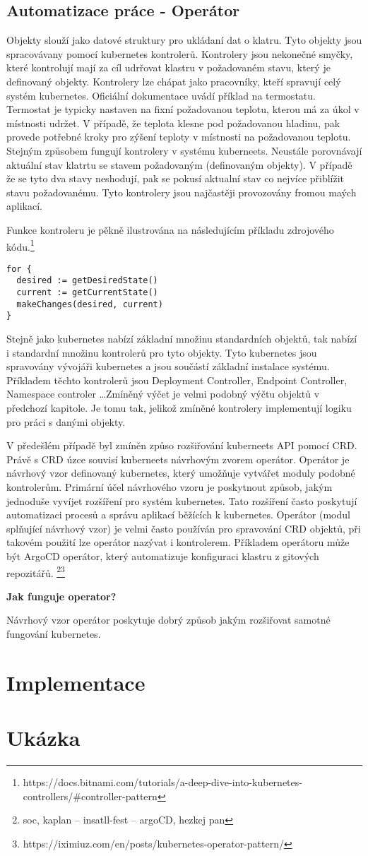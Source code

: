 \subsection{Automatizace práce - Operátor}
Objekty slouží jako datové struktury pro ukládaní dat o klatru. Tyto objekty jsou spracovávany pomocí kubernetes kontrolerů. Kontrolery jsou nekonečné smyčky, které kontrolují mají za cíl udrřovat klastru v požadovaném stavu, který je definovaný objekty. Kontrolery lze chápat jako pracovníky, kteří spravují celý systém kubernetes. Oficiální dokumentace uvádí příklad na termostatu. Termostat je typicky nastaven na fixní požadovanou teplotu, kterou má za úkol v místnosti udržet. V případě, že teplota klesne pod požadovanou hladinu, pak provede potřebné kroky pro zýšení teploty v místnosti na požadovanou teplotu. Stejným způsobem fungují kontrolery v systému kuberneets. Neustále porovnávají aktuální stav klatrtu se stavem požadovaným (definovaným objekty). V případě že se tyto dva stavy neshodují, pak se pokusí aktualní stav co nejvíce přiblížit stavu požadovanému. Tyto kontrolery jsou najčastěji provozovány fromou maých aplikací.

Funkce kontroleru je pěkně ilustrována na následujícím příkladu zdrojového kódu.\footnote{https://docs.bitnami.com/tutorials/a-deep-dive-into-kubernetes-controllers/\#controller-pattern}
\begin{verbatim}
for {
  desired := getDesiredState()
  current := getCurrentState()
  makeChanges(desired, current)
}
\end{verbatim}

Stejně jako kubernetes nabízí základní množinu standardních objektů, tak nabízí i standardní množinu kontrolerů pro tyto objekty. Tyto kubernetes jsou spravovány vývojáři kubernetes a jsou součástí základní instalace systému. Příkladem těchto kontrolerů jsou Deployment Controller, Endpoint Controller, Namespace controler \ldots Zmíněný výčet je velmi podobný výčtu objektů v předchozí kapitole. Je tomu tak, jelikož zmíněné kontrolery implementují logiku pro práci s danými objekty.   

V předešlém případě byl zmíněn způso rozšiřování kuberneets API pomocí CRD. Právě s CRD úzce souvisí kuberneets návrhovým zvorem operátor. Operátor je návrhový vzor definovaný kubernetes, který umožňuje vytvářet moduly podobné kontrolerům. Primární účel návrhového vzoru je poskytnout způsob, jakým jednoduše vyvíjet rozšíření pro systém kubernetes. Tato rozšíření často poskytují automatizaci procesů a správu aplikací běžících k kubernetes. Operátor (modul splňující návrhový vzor) je velmi často používán pro spravování CRD objektů, při takovém použití lze  operátor nazývat i kontrolerem. Příkladem operátoru může být ArgoCD operátor, který automatizuje konfiguraci klastru z gitových repozitářů.
\footnote{soc, kaplan -- insatll-fest -- argoCD, hezkej pan}\footnote{https://iximiuz.com/en/posts/kubernetes-operator-pattern/}

\textbf{Jak funguje operator?}

Návrhový vzor operátor poskytuje dobrý způsob jakým rozšiřovat samotné fungování kubernetes.
\section{Implementace}
\section{Ukázka}
